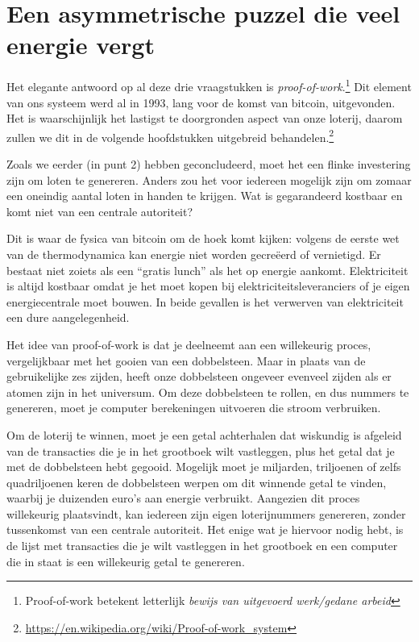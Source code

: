 \section[Een asymmetrische puzzel die veel energie vergt]{Een asymmetrische puzzel die veel energie vergt}

Het elegante antwoord op al deze drie vraagstukken is \textit{proof-of-work}.\footnote{ Proof-of-work betekent letterlijk \textit{bewijs van uitgevoerd werk/gedane arbeid}} Dit element van ons systeem werd al in 1993, lang voor de komst van bitcoin, uitgevonden. Het is waarschijnlijk het lastigst te doorgronden aspect van onze loterij, daarom zullen we dit in de volgende hoofdstukken uitgebreid behandelen.\footnote{\href{https://en.wikipedia.org/wiki/Proof-of-work\_system}{https://en.wikipedia.org/wiki/Proof-of-work\_system}} 

Zoals we eerder (in punt 2) hebben geconcludeerd, moet het een flinke investering zijn om loten te genereren. Anders zou het voor iedereen mogelijk zijn om zomaar een oneindig aantal loten in handen te krijgen. Wat is gegarandeerd kostbaar en komt niet van een centrale autoriteit?

Dit is waar de fysica van bitcoin om de hoek komt kijken: volgens de eerste wet van de thermodynamica kan energie niet worden gecreëerd of vernietigd. Er bestaat niet zoiets als een ``gratis lunch'' als het op energie aankomt. Elektriciteit is altijd kostbaar omdat je het moet kopen bij elektriciteitsleveranciers of je eigen energiecentrale moet bouwen. In beide gevallen is het verwerven van elektriciteit een dure aangelegenheid.

Het idee van proof-of-work is dat je deelneemt aan een willekeurig proces, vergelijkbaar met het gooien van een dobbelsteen. Maar in plaats van de gebruikelijke zes zijden, heeft onze dobbelsteen ongeveer evenveel zijden als er atomen zijn in het universum. Om deze dobbelsteen te rollen, en dus nummers te genereren, moet je computer berekeningen uitvoeren die stroom verbruiken.

Om de loterij te winnen, moet je een getal achterhalen dat wiskundig is afgeleid van de transacties die je in het grootboek wilt vastleggen, plus het getal dat je met de dobbelsteen hebt gegooid. Mogelijk moet je miljarden, triljoenen of zelfs quadriljoenen keren de dobbelsteen werpen om dit winnende getal te vinden, waarbij je duizenden euro's aan energie verbruikt. Aangezien dit proces willekeurig plaatsvindt, kan iedereen zijn eigen loterijnummers genereren, zonder tussenkomst van een centrale autoriteit. Het enige wat je hiervoor nodig hebt, is de lijst met transacties die je wilt vastleggen in het grootboek en een computer die in staat is een willekeurig getal te genereren. 


